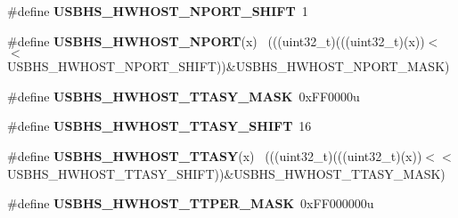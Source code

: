 \begin{DoxyCompactItemize}
\item 
\hypertarget{group___u_s_b_h_s___register___masks_gad9e5065a97ee45396544425ec2a15306}{}\#define {\bfseries U\+S\+B\+H\+S\+\_\+\+H\+W\+H\+O\+S\+T\+\_\+\+N\+P\+O\+R\+T\+\_\+\+S\+H\+I\+F\+T}~1\label{group___u_s_b_h_s___register___masks_gad9e5065a97ee45396544425ec2a15306}

\item 
\hypertarget{group___u_s_b_h_s___register___masks_gac0c06234eae54f64dde1c1502dbf2912}{}\#define {\bfseries U\+S\+B\+H\+S\+\_\+\+H\+W\+H\+O\+S\+T\+\_\+\+N\+P\+O\+R\+T}(x)                                    ~(((uint32\+\_\+t)(((uint32\+\_\+t)(x))$<$$<$U\+S\+B\+H\+S\+\_\+\+H\+W\+H\+O\+S\+T\+\_\+\+N\+P\+O\+R\+T\+\_\+\+S\+H\+I\+F\+T))\&U\+S\+B\+H\+S\+\_\+\+H\+W\+H\+O\+S\+T\+\_\+\+N\+P\+O\+R\+T\+\_\+\+M\+A\+S\+K)\label{group___u_s_b_h_s___register___masks_gac0c06234eae54f64dde1c1502dbf2912}

\item 
\hypertarget{group___u_s_b_h_s___register___masks_ga42be0abd1c24e268a473f098f6dfa4e7}{}\#define {\bfseries U\+S\+B\+H\+S\+\_\+\+H\+W\+H\+O\+S\+T\+\_\+\+T\+T\+A\+S\+Y\+\_\+\+M\+A\+S\+K}~0x\+F\+F0000u\label{group___u_s_b_h_s___register___masks_ga42be0abd1c24e268a473f098f6dfa4e7}

\item 
\hypertarget{group___u_s_b_h_s___register___masks_ga81932d60a5f44aa8dd0ed9439e37f870}{}\#define {\bfseries U\+S\+B\+H\+S\+\_\+\+H\+W\+H\+O\+S\+T\+\_\+\+T\+T\+A\+S\+Y\+\_\+\+S\+H\+I\+F\+T}~16\label{group___u_s_b_h_s___register___masks_ga81932d60a5f44aa8dd0ed9439e37f870}

\item 
\hypertarget{group___u_s_b_h_s___register___masks_ga811ce94ca12baa77dfd4785e5663206e}{}\#define {\bfseries U\+S\+B\+H\+S\+\_\+\+H\+W\+H\+O\+S\+T\+\_\+\+T\+T\+A\+S\+Y}(x)                                    ~(((uint32\+\_\+t)(((uint32\+\_\+t)(x))$<$$<$U\+S\+B\+H\+S\+\_\+\+H\+W\+H\+O\+S\+T\+\_\+\+T\+T\+A\+S\+Y\+\_\+\+S\+H\+I\+F\+T))\&U\+S\+B\+H\+S\+\_\+\+H\+W\+H\+O\+S\+T\+\_\+\+T\+T\+A\+S\+Y\+\_\+\+M\+A\+S\+K)\label{group___u_s_b_h_s___register___masks_ga811ce94ca12baa77dfd4785e5663206e}

\item 
\hypertarget{group___u_s_b_h_s___register___masks_gacdf649f79138304b2423fbfbc3b75d9a}{}\#define {\bfseries U\+S\+B\+H\+S\+\_\+\+H\+W\+H\+O\+S\+T\+\_\+\+T\+T\+P\+E\+R\+\_\+\+M\+A\+S\+K}~0x\+F\+F000000u\label{group___u_s_b_h_s___register___masks_gacdf649f79138304b2423fbfbc3b75d9a}


\end{DoxyCompactItemize}
